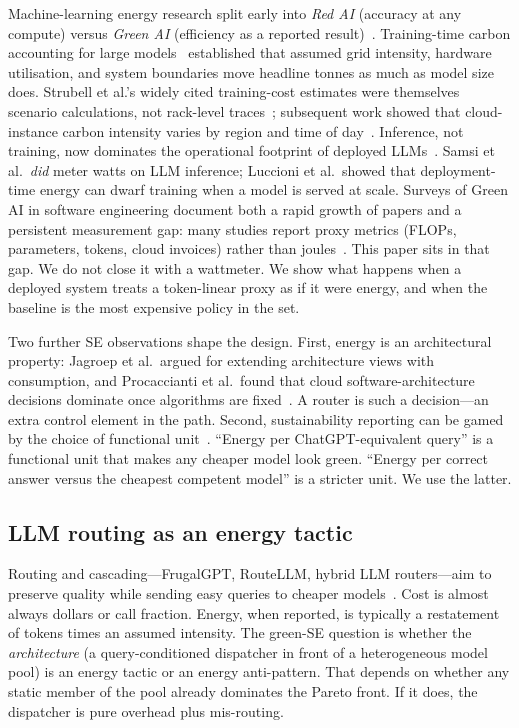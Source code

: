 \documentclass[10pt,conference]{IEEEtran}
\begin{document}
Machine-learning energy research split early into \emph{Red AI} (accuracy at any compute) versus \emph{Green AI} (efficiency as a reported result)~\cite{schwartz2020green}. Training-time carbon accounting for large models~\cite{strubell2019energy,patterson2021carbon,luccioni2023bloom,wu2022sustainable,faiz2024llmcarbon} established that assumed grid intensity, hardware utilisation, and system boundaries move headline tonnes as much as model size does. Strubell et al.'s widely cited training-cost estimates were themselves scenario calculations, not rack-level traces~\cite{strubell2019energy}; subsequent work showed that cloud-instance carbon intensity varies by region and time of day~\cite{dodge2022measuring}. Inference, not training, now dominates the operational footprint of deployed LLMs~\cite{luccioni2024power,samsi2023words}. Samsi et al.\ \emph{did} meter watts on LLM inference; Luccioni et al.\ showed that deployment-time energy can dwarf training when a model is served at scale. Surveys of Green AI in software engineering document both a rapid growth of papers and a persistent measurement gap: many studies report proxy metrics (FLOPs, parameters, tokens, cloud invoices) rather than joules~\cite{verdecchia2023green,martinez2022green,bannour2021evaluating,henderson2020towards}. This paper sits in that gap. We do not close it with a wattmeter. We show what happens when a deployed system treats a token-linear proxy as if it were energy, and when the baseline is the most expensive policy in the set.

Two further SE observations shape the design. First, energy is an architectural property: Jagroep et al.\ argued for extending architecture views with consumption, and Procaccianti et al.\ found that cloud software-architecture decisions dominate once algorithms are fixed~\cite{jagroep2017energy,procaccianti2015green}. A router is such a decision---an extra control element in the path. Second, sustainability reporting can be gamed by the choice of functional unit~\cite{lago2015framing,calero2021green}. ``Energy per ChatGPT-equivalent query'' is a functional unit that makes any cheaper model look green. ``Energy per correct answer versus the cheapest competent model'' is a stricter unit. We use the latter.

\subsection{LLM routing as an energy tactic}

Routing and cascading---FrugalGPT, RouteLLM, hybrid LLM routers---aim to preserve quality while sending easy queries to cheaper models~\cite{chen2023frugalgpt,ong2025routellm,stoica2024router}. Cost is almost always dollars or call fraction. Energy, when reported, is typically a restatement of tokens times an assumed intensity. The green-SE question is whether the \emph{architecture} (a query-conditioned dispatcher in front of a heterogeneous model pool) is an energy tactic or an energy anti-pattern. That depends on whether any static member of the pool already dominates the Pareto front. If it does, the dispatcher is pure overhead plus mis-routing.
\end{document}
